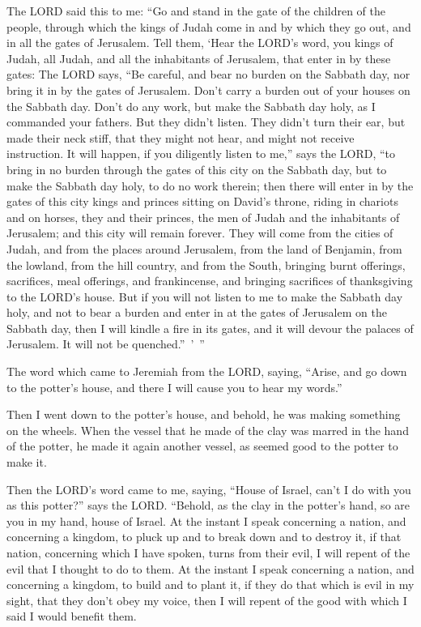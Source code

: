 \myverse{}The LORD said this to me: “Go and stand in the gate of the children of the people, through which the kings of Judah come in and by which they go out, and in all the gates of Jerusalem. \myverse{}Tell them, ‘Hear the LORD’s word, you kings of Judah, all Judah, and all the inhabitants of Jerusalem, that enter in by these gates: \myverse{}The LORD says, “Be careful, and bear no burden on the Sabbath day, nor bring it in by the gates of Jerusalem. \myverse{}Don’t carry a burden out of your houses on the Sabbath day. Don’t do any work, but make the Sabbath day holy, as I commanded your fathers. \myverse{}But they didn’t listen. They didn’t turn their ear, but made their neck stiff, that they might not hear, and might not receive instruction. \myverse{}It will happen, if you diligently listen to me,” says the LORD, “to bring in no burden through the gates of this city on the Sabbath day, but to make the Sabbath day holy, to do no work therein; \myverse{}then there will enter in by the gates of this city kings and princes sitting on David’s throne, riding in chariots and on horses, they and their princes, the men of Judah and the inhabitants of Jerusalem; and this city will remain forever. \myverse{}They will come from the cities of Judah, and from the places around Jerusalem, from the land of Benjamin, from the lowland, from the hill country, and from the South, bringing burnt offerings, sacrifices, meal offerings, and frankincense, and bringing sacrifices of thanksgiving to the LORD’s house. \myverse{}But if you will not listen to me to make the Sabbath day holy, and not to bear a burden and enter in at the gates of Jerusalem on the Sabbath day, then I will kindle a fire in its gates, and it will devour the palaces of Jerusalem. It will not be quenched.” ’ ”


\mychapter{} 
\myverse*{}The word which came to Jeremiah from the LORD, saying, \myverse{}“Arise, and go down to the potter’s house, and there I will cause you to hear
my words.”


\myverse{}Then I went down to the potter’s house, and behold, he was making something on the wheels. \myverse{}When the vessel that he made of the clay was marred in the hand of the potter, he made it again another vessel, as seemed good to the potter to make it.


\myverse{}Then the LORD’s word came to me, saying, \myverse{}“House of Israel, can’t I do with you as this potter?” says the LORD. “Behold, as the clay in the potter’s hand, so are you in my hand, house of Israel. \myverse{}At the instant I speak concerning a nation, and concerning a kingdom, to pluck up and to break down and to destroy it, \myverse{}if that nation, concerning which I have spoken, turns from their evil, I will repent of the evil that I thought to do to them. \myverse{}At the instant I speak concerning a nation, and concerning a kingdom, to build and to plant it, \myverse{}if they do that which is evil in my sight, that they don’t obey my voice, then I will repent of the good with which I said I would benefit them.

